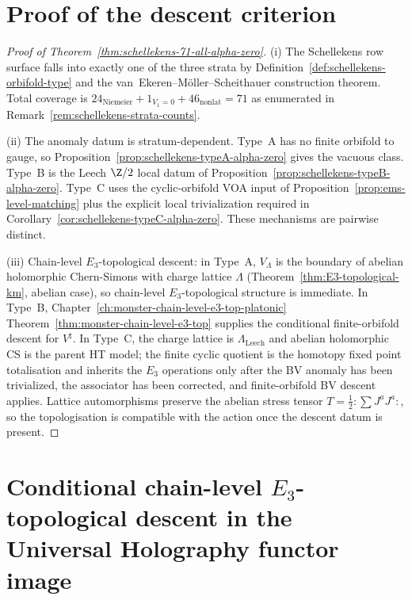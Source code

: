 \section{Proof of the descent criterion}
\label{sec:schellekens-71-proof-assembly}

\begin{proof}[Proof of Theorem~\ref{thm:schellekens-71-all-alpha-zero}]
(i) The Schellekens row surface falls into exactly one of the three
strata by Definition~\ref{def:schellekens-orbifold-type} and the
van~Ekeren--M\"oller--Scheithauer construction theorem. Total coverage is
$24_{\mathrm{Niemeier}} + 1_{V_1=0} + 46_{\mathrm{nonlat}} = 71$
as enumerated in
Remark~\ref{rem:schellekens-strata-counts}.

(ii) The anomaly datum is stratum-dependent. Type~A has no finite
orbifold to gauge, so Proposition~\ref{prop:schellekens-typeA-alpha-zero}
gives the vacuous class. Type~B is the Leech $\Z/2$ local datum of
Proposition~\ref{prop:schellekens-typeB-alpha-zero}. Type~C uses the
cyclic-orbifold VOA input of Proposition~\ref{prop:ems-level-matching}
plus the explicit local trivialization required in
Corollary~\ref{cor:schellekens-typeC-alpha-zero}. These mechanisms are
pairwise distinct.

(iii) Chain-level $E_3$-topological descent: in Type~A, $V_\Lambda$ is
the boundary of abelian holomorphic Chern-Simons with charge lattice
$\Lambda$ (Theorem~\ref*{thm:E3-topological-km}, abelian case),
so chain-level $E_3$-topological structure is immediate. In Type~B,
Chapter~\ref*{ch:monster-chain-level-e3-top-platonic}
Theorem~\ref*{thm:monster-chain-level-e3-top} supplies the conditional
finite-orbifold descent for $V^\natural$. In Type~C, the charge
lattice is $\Lambda_{\mathrm{Leech}}$ and abelian holomorphic CS is
the parent HT model; the finite cyclic quotient is the homotopy fixed
point totalisation and inherits the $E_3$ operations only after the BV
anomaly has been trivialized, the associator has been corrected, and
finite-orbifold BV descent applies. Lattice automorphisms preserve the
abelian stress tensor $T = \frac{1}{2} :\sum J^a J^a:$, so the
topologisation is compatible with the action once the descent datum is
present.
\end{proof}

\section{Conditional chain-level $E_3$-topological descent in the Universal
Holography functor image}
\label{sec:schellekens-e3-uhf-image}

